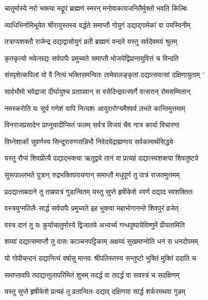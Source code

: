 \twolineshloka
{चातुर्मास्ये नरो भक्त्या मद्रूपं ब्राह्मणं स्मरन्}
{मनोवाकायजनितैर्मुक्तो भवति किल्बिः} %

\twolineshloka
{व्याधिभिर्नामिभूयेत श्रीरायुस्तस्य वर्द्धते}
{समाप्तौ गोयुगं दद्याद्गामेकां वा पयस्विनीम्} %

\twolineshloka
{तत्राप्यशक्तौ राजेन्द्र दद्याद्वासोयुगं व्रती}
{ब्राह्मणं वन्दते यस्तु सर्वदेवमयं श्रुतम्} %

\twolineshloka
{कृतकृत्यो भवेत्सद्यः सर्वपापैः प्रमुच्यते}
{समाप्तौ भोजयेद्विप्रानायुवित्तं च विन्दति} %

\twolineshloka
{संस्पृशेत्कपिलां यो वै नित्यं भक्तिसमन्वितः}
{तामेवालङ्कृतां दद्यात्सवत्सां दक्षिणायुताम् '} %

\twolineshloka
{सार्वभौमो भवेद्राजा दीर्घायुश्च प्रतापवान्}
{स वसेदिन्द्रवत्स्वर्गे वत्सरान् रोमसम्मितान्} %

\twolineshloka
{नमस्करोति यः सूर्य गणेशं वापि नित्यशः}
{आयुरारोग्यमैश्वर्य लभते कान्तिमुत्तमाम्} %

\twolineshloka
{विनराजप्रसादेन प्राप्नुयादीप्सितं फलम्}
{सर्वत्र विजयं चैव नात्र कार्या विचारणा} %

\twolineshloka
{विघ्नेशाकों सुवर्णस्य सिन्दूरारुणसन्निभौ}
{निवेदयेद्राह्मणाय सर्वकामार्थसिद्धये} %

\twolineshloka
{यस्तु रौप्यं शिवप्रीत्यै दद्याद्भक्त्या ऋतुद्वये}
{तानं वा प्रत्यहं दद्यात्स्वशक्त्या शिवतुष्टये} %

\twolineshloka
{सुरूपाल्लभते पुत्रान् रुद्रभक्तिपरायणान्}
{समाप्तौ मधुपूर्ण तु पात्रं राजतमुत्तमम्} %

\twolineshloka
{प्रदद्यात्ताम्रदाने तु ताम्रपात्रं गुडान्वितम्}
{यस्तु सुप्ते हृषीकेशे स्वर्ण दद्याद स्वशक्तितः} %

\twolineshloka
{वस्त्रयुग्मतिलैः सार्द्ध सर्वपापैः प्रमुच्यते}
{इह भुक्त्वा महाभोगानन्ते शिवपुरं व्रजेत्} %

\twolineshloka
{वस्त्र दानं तु यः कुर्याचातुर्मास्ये द्विजातये}
{अभ्यर्च्य गन्धपुष्पायेविष्णुमें प्रीयतामिति} %

\twolineshloka
{शय्यां दद्यात्समाप्तौ तु वासः काञ्चनपट्टिकाम्}
{अक्षय्यं सुखमाप्नोति धनं स धनदोपमम्} %

\twolineshloka
{यो गोपीचन्दनं दद्यानित्यं वर्षासु मानवः}
{श्रीपतिस्तस्य सन्तुष्टो भुक्तिं मुक्तिं ददाति च} %

\twolineshloka
{समाप्तावपि तदद्यात्तुलापरिमितं शुभम्}
{तदर्द्ध वा तदर्द्ध वा सवस्त्रं च सदक्षिणम्} %

\twolineshloka
{यस्तु सुप्ते हृषीकेशे प्रत्यहं तु व्रतान्वितः}
{दद्याद् दक्षिणया सार्द्ध शर्करमथवा गुडम्} %

